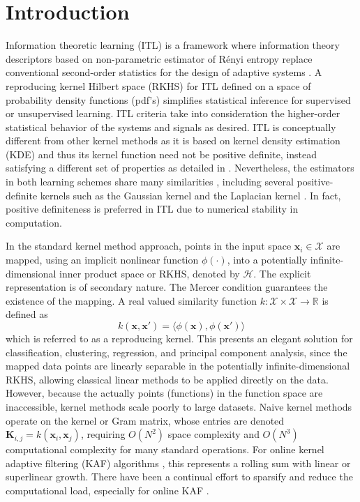 \documentclass[8pt,twocolumn]{IEEEtran}
\newcommand{\R}{\mathbb{R}}
\begin{document}
\section{Introduction}
Information theoretic learning (ITL) is a framework where information theory descriptors based on non-parametric estimator of R\'{e}nyi entropy replace conventional second-order statistics for the design of adaptive systems \cite{ITL}. A reproducing kernel Hilbert space (RKHS) for ITL defined on a space of probability density functions (pdf's) simplifies statistical inference for supervised or unsupervised learning. ITL criteria take into consideration the higher-order statistical behavior of the systems and signals as desired. ITL is conceptually different from other kernel methods as it is based on kernel density estimation (KDE) and thus its kernel function need not be positive definite, instead satisfying a different set of properties as detailed in \cite{Parzen1962}. Nevertheless, the estimators in both learning schemes share many similarities \cite{Xu08}, including several positive-definite kernels such as the Gaussian kernel and the Laplacian kernel \cite{Parzen1962}. In fact, positive definiteness is preferred in ITL due to numerical stability in computation.

In the standard kernel method approach, points in the input space $\mathbf{x}_i\in\mathcal{X}$ are mapped, using an implicit nonlinear function $\phi(\cdot)$, into a potentially infinite-dimensional inner product space or RKHS, denoted by $\mathcal{H}$. The explicit representation is of secondary nature. The Mercer condition guarantees the existence of the mapping. A real valued similarity function $k:\mathcal{X}\times\mathcal{X}\rightarrow \R$ is defined as
\begin{equation}
k(\mathbf{x},\mathbf{x}')=\langle\phi(\mathbf{x}),\phi(\mathbf{x}')\rangle
\end{equation}
which is referred to as a reproducing kernel. This presents an elegant solution for classification, clustering, regression, and principal component analysis, since the mapped data points are linearly separable in the potentially infinite-dimensional RKHS, allowing classical linear methods to be applied directly on the data. However, because the actually points (functions) in the function space are inaccessible, kernel methods scale poorly to large datasets. Naive kernel methods operate on the kernel or Gram matrix, whose entries are denoted $\mathbf{K}_{i,j}=k(\mathbf{x}_i,\mathbf{x}_j)$, requiring $O(N^2)$ space complexity and $O(N^3)$ computational complexity for many standard operations. For online kernel adaptive filtering (KAF) algorithms \cite{Liu10,KAARMA,Li2018,Li2019functional}, this represents a rolling sum with linear or superlinear growth. There have been a continual effort to sparsify and reduce the computational load, especially for online KAF \cite{QKLMS, NICE,SNIPGOAL}.
\end{document}
